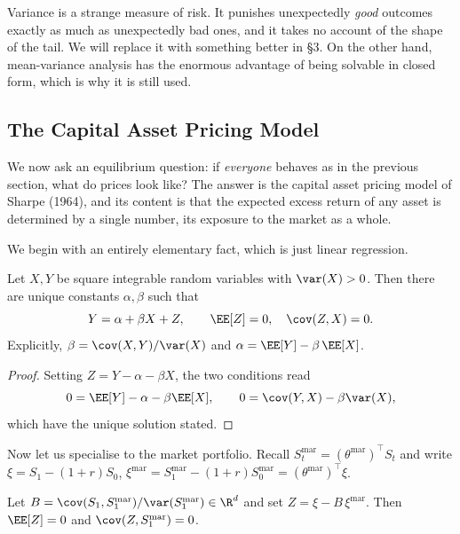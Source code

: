 \begin{remark}
	Variance is a strange measure of risk. It punishes unexpectedly \emph{good} outcomes exactly as much as unexpectedly bad ones, and it takes no account of the shape of the tail. We will replace it with something better in \S3. On the other hand, mean-variance analysis has the enormous advantage of being solvable in closed form, which is why it is still used.
\end{remark}

\subsection{The Capital Asset Pricing Model}

We now ask an equilibrium question: if \emph{everyone} behaves as in the previous section, what do prices look like? The answer is the capital asset pricing model of Sharpe (1964), and its content is that the expected excess return of any asset is determined by a single number, its exposure to the market as a whole.

We begin with an entirely elementary fact, which is just linear regression.

\begin{proposition}\label{prop:regression}
	Let $X, Y$ be square integrable random variables with $\var(X) > 0$. Then there are unique constants $\alpha, \beta$ such that
	$$
	Y = \alpha + \beta X + Z, \qquad \EE[Z] = 0, \quad \cov(Z,X) = 0.
	$$
	Explicitly, $\beta = \cov(X,Y)/\var(X)$ and $\alpha = \EE[Y] - \beta\,\EE[X]$.
\end{proposition}

\begin{proof}
	Setting $Z = Y - \alpha - \beta X$, the two conditions read
	$$
	0 = \EE[Y] - \alpha - \beta \EE[X], \qquad 0 = \cov(Y,X) - \beta\var(X),
	$$
	which have the unique solution stated.
\end{proof}

Now let us specialise to the market portfolio. Recall $S^{\mathrm{mar}}_t = (\theta^{\mathrm{mar}})^\top S_t$ and write $\xi = S_1 - (1+r)S_0$, $\xi^{\mathrm{mar}} = S_1^{\mathrm{mar}} - (1+r)S_0^{\mathrm{mar}} = (\theta^{\mathrm{mar}})^\top \xi$.

\begin{theorem}\label{thm:capm-vector}
	Let $B = \cov(S_1, S_1^{\mathrm{mar}})/\var(S_1^{\mathrm{mar}}) \in \R^d$ and set $Z = \xi - B\,\xi^{\mathrm{mar}}$. Then $\EE[Z] = 0$ and $\cov(Z, S_1^{\mathrm{mar}}) = 0$.
\end{theorem}

